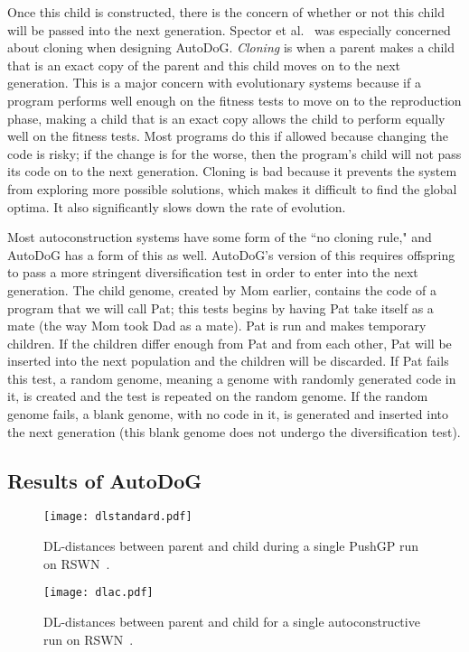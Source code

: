 \documentclass{sig-alternate}
\begin{document}
Once this child is constructed, there is the concern of whether or not this child will be passed into the next generation. Spector et al.~\cite{spector:2016} was especially concerned about cloning when designing AutoDoG. \textit{Cloning} is when a parent makes a child that is an exact copy of the parent and this child moves on to the next generation. This is a major concern with evolutionary systems because if a program performs well enough on the fitness tests to move on to the reproduction phase, making a child that is an exact copy allows the child to perform equally well on the fitness tests. Most programs do this if allowed because changing the code is risky; if the change is for the worse, then the program's child will not pass its code on to the next generation. Cloning is bad because it prevents the system from exploring more possible solutions, which makes it difficult to find the global optima. It also significantly slows down the rate of evolution.

Most autoconstruction systems have some form of the ``no cloning rule," and AutoDoG has a form of this as well. AutoDoG's version of this requires offspring to pass a more stringent diversification test in order to enter into the next generation. The child genome, created by Mom earlier, contains the code of a program that we will call Pat; this tests begins by having Pat take itself as a mate (the way Mom took Dad as a mate). Pat is run and makes temporary children. If the children differ enough from Pat and from each other, Pat will be inserted into the next population and the children will be discarded. If Pat fails this test, a random genome, meaning a genome with randomly generated code in it, is created and the test is repeated on the random genome. If the random genome fails, a blank genome, with no code in it, is generated and inserted into the next generation (this blank genome does not undergo the diversification test).

\subsection{Results of AutoDoG}
\label{sec:results}
\begin{figure*}
	\centering
	\begin{minipage}[b]{0.4\textwidth}
		\texttt{[image: dlstandard.pdf]}
		\caption{DL-distances between parent and child during a single PushGP run on RSWN~\cite{spector:2016}.}
		\label{fig:standard}
	\end{minipage}
	\hfill
	\begin{minipage}[b]{0.4\textwidth}
		\texttt{[image: dlac.pdf]}
		\caption{DL-distances between parent and child for a single autoconstructive run on RSWN~\cite{spector:2016}.}
		\label{fig:ac}
	\end{minipage}
\end{figure*}
\end{document}
